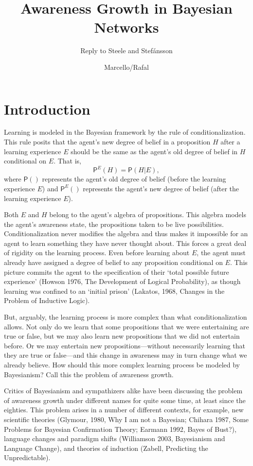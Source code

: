 \documentclass[
  11pt,
  dvipsnames,enabledeprecatedfontcommands]{scrartcl}
\title{Awareness Growth in Bayesian Networks}
\subtitle{Reply to Steele and Stefánsson}
\author{Marcello/Rafal}
\date{}
\newcommand{\pr}[1]{\ensuremath{\mathsf{P}(#1)}}
\newcommand{\ppr}[2]{\ensuremath{\mathsf{P}^{#1}(#2)}}
\begin{document}
\maketitle

\hypertarget{introduction}{%
\section{Introduction}\label{introduction}}

Learning is modeled in the Bayesian framework by the rule of
conditionalization. This rule posits that the agent's new degree of
belief in a proposition \(H\) after a learning experience \(E\) should
be the same as the agent's old degree of belief in \(H\) conditional on
\(E\). That is, \[\ppr{E}{H}=\pr{H \vert E},\] where \(\pr{}\)
represents the agent's old degree of belief (before the learning
experience \(E\)) and \(\ppr{E}{}\) represents the agent's new degree of
belief (after the learning experience \(E\)).

Both \(E\) and \(H\) belong to the agent's algebra of propositions. This
algebra models the agent's awareness state, the propositions taken to be
live possibilities. Conditionalization never modifies the algebra and
thus makes it impossible for an agent to learn something they have never
thought about. This forces a great deal of rigidity on the learning
process. Even before learning about \(E\), the agent must already have
assigned a degree of belief to any proposition conditional on \(E\).
This picture commits the agent to the specification of their `total
possible future experience' (Howson 1976, The Development of Logical
Probability), as though learning was confined to an `initial prison'
(Lakatos, 1968, Changes in the Problem of Inductive Logic).

But, arguably, the learning process is more complex than what
conditionalization allows. Not only do we learn that some propositions
that we were entertaining are true or false, but we may also learn new
propositions that we did not entertain before. Or we may entertain new
propositions---without necessarily learning that they are true or
false---and this change in awareness may in turn change what we already
believe. How should this more complex learning process be modeled by
Bayesianism? Call this the problem of awareness growth.

Critics of Bayesianism and sympathizers alike have been discussing the
problem of awareness growth under different names for quite some time,
at least since the eighties. This problem arises in a number of
different contexts, for example, new scientific theories (Glymour, 1980,
Why I am not a Bayesian; Chihara 1987, Some Problems for Bayesian
Confirmation Theory; Earmann 1992, Bayes of Bust?), language changes and
paradigm shifts (Williamson 2003, Bayesianism and Language Change), and
theories of induction (Zabell, Predicting the Unpredictable).
\end{document}
